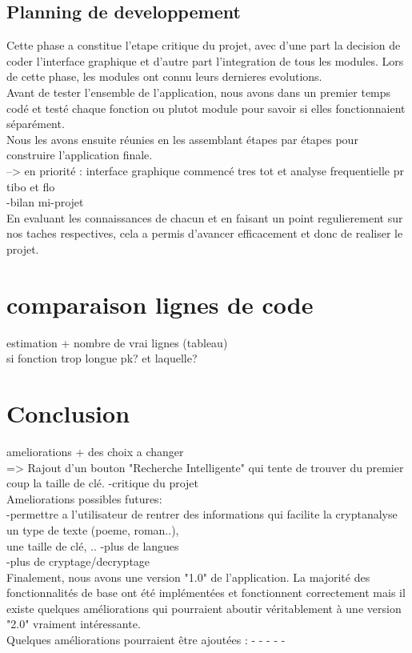 \documentclass[a4]{article}
\begin{document}
		\subsection{Planning de developpement}
		Cette phase a constitue l’etape critique du projet, avec d’une part la decision de coder l’interface graphique
et d’autre part l’integration de tous les modules. Lors de cette phase, les modules ont connu leurs dernieres evolutions. \\
Avant de tester l’ensemble de l’application, nous avons dans un premier temps codé et
testé chaque fonction ou plutot module pour savoir si elles fonctionnaient séparément. \\
Nous les avons ensuite
réunies en les assemblant étapes par étapes pour construire l’application finale.  \\
--> en priorité : interface graphique commencé tres tot et analyse frequentielle pr tibo et flo \\
-bilan mi-projet \\
En evaluant les connaissances de chacun et en faisant un point regulierement sur nos taches respectives, cela a permis d'avancer efficacement et donc de realiser le projet.
	\section{comparaison lignes de code}
		estimation + nombre de vrai lignes (tableau) \\
		si fonction trop longue pk? et laquelle? \\
		
	
	\section{Conclusion}
	ameliorations + des choix a changer  \\
	=> Rajout d'un bouton "Recherche Intelligente" qui tente de trouver du premier coup la taille de clé.
	-critique du projet \\
	Ameliorations possibles futures: \\
	-permettre a l'utilisateur de rentrer des informations qui facilite la cryptanalyse un type de texte (poeme, roman..),\\
	une taille de clé, ..
	-plus de langues \\
	-plus de cryptage/decryptage \\
	
	Finalement, nous avons une version "1.0" de l’application. La majorité des fonctionnalités
de base ont été implémentées et fonctionnent correctement mais il existe quelques
améliorations qui pourraient aboutir véritablement à une version "2.0" vraiment intéressante. \\
Quelques améliorations pourraient être ajoutées :
-
- 
- 
- 
-
	
\end{document}
